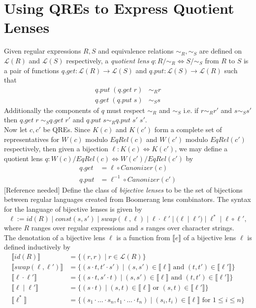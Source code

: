 \documentclass{svproc}
\begin{document}
\section{Using QREs to Express Quotient Lenses}
Given regular expressions $R, S$ and equivalence relations $\sim_R, \sim_S$ are
defined on $\mathcal{L}(R)$ and $\mathcal{L}(S)$ respectively, a
\textit{quotient lens} $q :
R/{\sim_R}{\Longleftrightarrow} S/{\sim_S}$ from $R$ to $S$ is
a pair of functions $q.get:
\mathcal{L}(R) \longrightarrow \mathcal{L}(S)$ and $q.put : \mathcal{L}(S)
\longrightarrow \mathcal{L}(R)$ such that
\begin{align*}
q.put \; (q.get \; r) &\sim_R r\\
q.get \; (q.put \; s) &\sim_S s
\end{align*}
Additionally the components of $q$ must respect $\sim_R$ and $\sim_S$ i.e.
if $r \sim_R r'$ and $s \sim_S s'$ then $q.get \; r \; \sim_S q.get \; r'$
and $q.put \; s \sim_R q.put \; s' \; s'$.\\
Now let $c, c'$ be QREs. Since $K(c)$ and $K(c')$ form a complete set of
representatives for $W(c)$ modulo $EqRel(c)$ and $W(c')$ modulo $EqRel(c')$
respectively, then given a bijection $\ell : K(c) \Leftrightarrow K(c')$, we
may define a quotient lens $q : W(c)/EqRel(c) \Leftrightarrow
W(c')/EqRel(c')$ by 
\begin{align*}
q.get &= \ell \circ Canonizer(c)\\
q.put &= \ell^{-1} \circ Canonizer(c')
\end{align*}
[Reference needed] Define the class of \textit{bijective lenses} to be the set
of bijections between regular languages created from Boomerang lens combinators.
The syntax for the language of bijective lenses is given by
$$\ell := id(R) \; | \; const(s, s') \; | \;  swap(\ell,
\ell) \; | \; \ell \cdot \ell' \; |  \; (\ell \; | \; \ell') \; | \; \ell^* \;
| \; \ell \circ \ell',$$ where $R$ ranges over regular expressions and $s$
ranges over character strings.\\
The denotation of a bijective lens $\ell$ is a function from 
$\llbracket e \rrbracket$ of a bijective lens $\ell$ is defined
inductively by
\begin{align*}
\llbracket id(R) \rrbracket &= \{(r, r) \; | \; r \in \mathcal{L}(R)\}\\
\llbracket swap(\ell, \ell') \rrbracket &= \{(s \cdot t, t' \cdot s') \; | \;
(s, s') \in \llbracket \ell \rrbracket \text{ and } (t, t') \in \llbracket
\ell' \rrbracket\}\\
\llbracket \ell \cdot \ell' \rrbracket &= \{(s \cdot t, s' \cdot t) \; | \;
(s, s') \in \llbracket \ell \rrbracket \text{ and } (t, t') \in \llbracket
\ell' \rrbracket\}\\
\llbracket \ell \; | \; \ell' \rrbracket &= \{(s \cdot t) \; | \;
(s, t) \in \llbracket \ell \rrbracket \text{ or } (s, t) \in \llbracket
\ell' \rrbracket\}\\
\llbracket \ell^* \rrbracket &= \{(s_1 \cdot \ldots \cdot s_n, t_1 \cdot \ldots
\cdot t_n) \; | \; (s_i, t_i) \in \llbracket \ell \rrbracket \text{ for } 1
\leq i \leq n\}
\end{align*}
\end{document}

